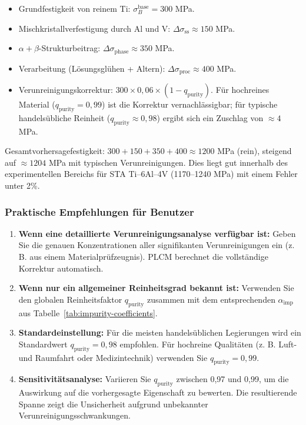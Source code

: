 \documentclass[12pt,a4paper]{article}
\begin{document}
	\begin{itemize}
		\item Grundfestigkeit von reinem Ti: \(\sigma_B^{\mathrm{base}} = 300\) MPa.
		\item Mischkristallverfestigung durch Al und V: \(\Delta\sigma_{\mathrm{ss}} \approx 150\) MPa.
		\item \(\alpha+\beta\)-Strukturbeitrag: \(\Delta\sigma_{\mathrm{phase}} \approx 350\) MPa.
		\item Verarbeitung (Lösungsglühen + Altern): \(\Delta\sigma_{\mathrm{proc}} \approx 400\) MPa.
		\item Verunreinigungskorrektur: \(300 \times 0,06 \times (1 - q_{\mathrm{purity}})\). Für hochreines Material (\(q_{\mathrm{purity}}=0,99\)) ist die Korrektur vernachlässigbar; für typische handelsübliche Reinheit (\(q_{\mathrm{purity}}\approx 0,98\)) ergibt sich ein Zuschlag von \(\approx 4\) MPa.
	\end{itemize}
	
	Gesamtvorhersagefestigkeit: \(300+150+350+400 \approx 1200\) MPa (rein), steigend auf \(\approx 1204\) MPa mit typischen Verunreinigungen. Dies liegt gut innerhalb des experimentellen Bereichs für STA Ti--6Al--4V (1170–1240 MPa) mit einem Fehler unter 2\%.
	
	\subsubsection*{Praktische Empfehlungen für Benutzer}
	
	\begin{enumerate}
		\item \textbf{Wenn eine detaillierte Verunreinigungsanalyse verfügbar ist:} Geben Sie die genauen Konzentrationen aller signifikanten Verunreinigungen ein (z. B. aus einem Materialprüfzeugnis). PLCM berechnet die vollständige Korrektur automatisch.
		\item \textbf{Wenn nur ein allgemeiner Reinheitsgrad bekannt ist:} Verwenden Sie den globalen Reinheitsfaktor \(q_{\mathrm{purity}}\) zusammen mit dem entsprechenden \(\alpha_{\mathrm{imp}}\) aus Tabelle~\ref{tab:impurity-coefficients}.
		\item \textbf{Standardeinstellung:} Für die meisten handelsüblichen Legierungen wird ein Standardwert \(q_{\mathrm{purity}} = 0,98\) empfohlen. Für hochreine Qualitäten (z. B. Luft- und Raumfahrt oder Medizintechnik) verwenden Sie \(q_{\mathrm{purity}} = 0,99\).
		\item \textbf{Sensitivitätsanalyse:} Variieren Sie \(q_{\mathrm{purity}}\) zwischen 0,97 und 0,99, um die Auswirkung auf die vorhergesagte Eigenschaft zu bewerten. Die resultierende Spanne zeigt die Unsicherheit aufgrund unbekannter Verunreinigungsschwankungen.
	\end{enumerate}
	
\end{document}
